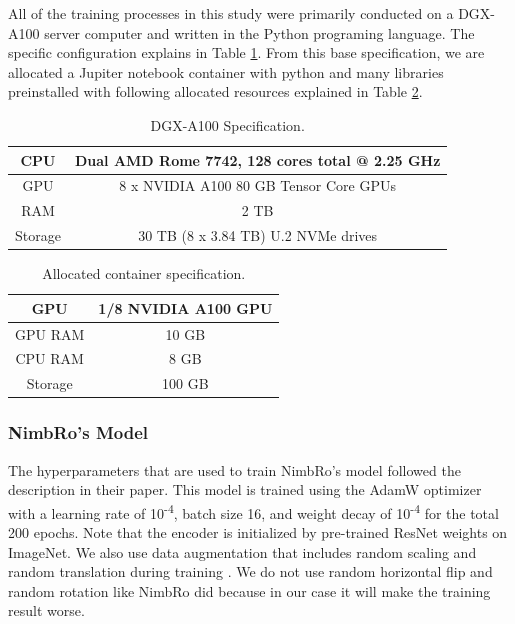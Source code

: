 All of the training processes in this study were primarily conducted on a DGX-A100 server computer and written in the Python programing language. The specific configuration explains in Table \ref{tb:dgxa100}.
From this base specification, we are allocated a Jupiter notebook container with
python and many libraries preinstalled with following allocated resources explained in Table \ref{tb:allocatedcontainer}.
\begin{longtable}{|c|c|}
  \caption{DGX-A100 Specification.}
  \label{tb:dgxa100}\\
  \hline
  CPU     & Dual AMD Rome 7742, 128 cores total @ 2.25 GHz \\
  \hline
  GPU     & 8 x NVIDIA A100 80 GB Tensor Core GPUs  \\
  \hline
  RAM     & 2 TB \\
  \hline
  Storage & 30 TB (8 x 3.84 TB) U.2 NVMe drives \\
  \hline
\end{longtable}

\begin{longtable}{|c|c|}
  \caption{Allocated container specification.}
  \label{tb:allocatedcontainer}\\
  \hline
  GPU     & 1/8 NVIDIA A100 GPU \\
  \hline
  GPU RAM & 10 GB  \\
  \hline
  CPU RAM & 8 GB \\
  \hline
  Storage & 100 GB  \\
  \hline
\end{longtable}

\subsubsection{NimbRo's Model}
\label{subsubsec:training-nimbro-model}

The hyperparameters that are used to train NimbRo's model followed the description in their paper.
This model is trained using the AdamW optimizer with a learning rate of 10\textsuperscript{-4},
batch size 16, and weight decay of 10\textsuperscript{-4} for the total 200 epochs.
Note that the encoder is initialized by pre-trained ResNet weights on ImageNet.
We also use data augmentation that includes random scaling and random translation during training \parencite{amini2021}.
We do not use random horizontal flip and random rotation like NimbRo did because in our case it will make the training result worse.

